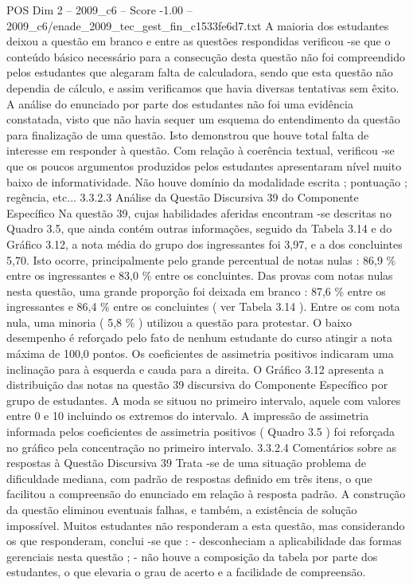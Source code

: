 \begin{textsample}{POS Dim 2 – 2009\_c6 – Score -1.00 – 2009\_c6/enade\_2009\_tec\_gest\_fin\_c1533fe6d7.txt}
A maioria dos estudantes deixou a questão em branco e entre as questões respondidas verificou -se que o conteúdo básico necessário para a consecução desta questão não foi compreendido pelos estudantes que alegaram falta de calculadora, sendo que esta questão não dependia de cálculo, e assim verificamos que havia diversas tentativas sem êxito.
A análise do enunciado por parte dos estudantes não foi uma evidência constatada, visto que não havia sequer um esquema do entendimento da questão para finalização de uma questão.
Isto demonstrou que houve total falta de interesse em responder à questão.
Com relação à coerência textual, verificou -se que os poucos argumentos produzidos pelos estudantes apresentaram nível muito baixo de informatividade.
Não houve domínio da modalidade escrita ; pontuação ; regência, etc... 3.3.2.3 Análise da Questão Discursiva 39 do Componente Específico Na questão 39, cujas habilidades aferidas encontram -se descritas no Quadro 3.5, que ainda contém outras informações, seguido da Tabela 3.14 e do Gráfico 3.12, a nota média do grupo dos ingressantes foi 3,97, e a dos concluintes 5,70.
Isto ocorre, principalmente pelo grande percentual de notas nulas : 86,9 \% entre os ingressantes e 83,0 \% entre os concluintes.
Das provas com notas nulas nesta questão, uma grande proporção foi deixada em branco : 87,6 \% entre os ingressantes e 86,4 \% entre os concluintes ( ver Tabela 3.14 ).
Entre os com nota nula, uma minoria ( 5,8 \% ) utilizou a questão para protestar.
O baixo desempenho é reforçado pelo fato de nenhum estudante do curso atingir a nota máxima de 100,0 pontos.
Os coeficientes de assimetria positivos indicaram uma inclinação para à esquerda e cauda para a direita.
O Gráfico 3.12 apresenta a distribuição das notas na questão 39 discursiva do Componente Específico por grupo de estudantes.
A moda se situou no primeiro intervalo, aquele com valores entre 0 e 10 incluindo os extremos do intervalo.
A impressão de assimetria informada pelos coeficientes de assimetria positivos ( Quadro 3.5 ) foi reforçada no gráfico pela concentração no primeiro intervalo. 3.3.2.4 Comentários sobre as respostas à Questão Discursiva 39 Trata -se de uma situação problema de dificuldade mediana, com padrão de respostas definido em três itens, o que facilitou a compreensão do enunciado em relação à resposta padrão.
A construção da questão eliminou eventuais falhas, e também, a existência de solução impossível.
Muitos estudantes não responderam a esta questão, mas considerando os que responderam, conclui -se que : - desconheciam a aplicabilidade das formas gerenciais nesta questão ; - não houve a composição da tabela por parte dos estudantes, o que elevaria o grau de acerto e a facilidade de compreensão.

\end{textsample}
